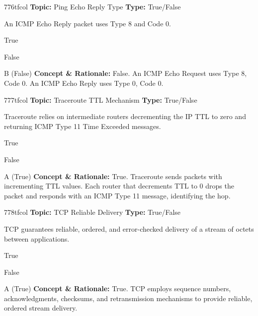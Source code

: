 \begin{qcard}{776}{tfcol}
\textcolor{darkslate!75}{\small\textbf{Topic:} Ping Echo Reply Type \hfill \textbf{Type:} True/False}\vspace{0.4em}\par
An ICMP Echo Reply packet uses Type 8 and Code 0.
\begin{qoptions}
\item True
\item False
\end{qoptions}
\end{qcard}
\nopagebreak
\begin{explainbox}{B (False)}
\textbf{Concept \& Rationale:} False. An ICMP Echo Request uses Type 8, Code 0. An ICMP Echo Reply uses Type 0, Code 0.
\end{explainbox}

\begin{qcard}{777}{tfcol}
\textcolor{darkslate!75}{\small\textbf{Topic:} Traceroute TTL Mechanism \hfill \textbf{Type:} True/False}\vspace{0.4em}\par
Traceroute relies on intermediate routers decrementing the IP TTL to zero and returning ICMP Type 11 Time Exceeded messages.
\begin{qoptions}
\item True
\item False
\end{qoptions}
\end{qcard}
\nopagebreak
\begin{explainbox}{A (True)}
\textbf{Concept \& Rationale:} True. Traceroute sends packets with incrementing TTL values. Each router that decrements TTL to 0 drops the packet and responds with an ICMP Type 11 message, identifying the hop.
\end{explainbox}

\begin{qcard}{778}{tfcol}
\textcolor{darkslate!75}{\small\textbf{Topic:} TCP Reliable Delivery \hfill \textbf{Type:} True/False}\vspace{0.4em}\par
TCP guarantees reliable, ordered, and error-checked delivery of a stream of octets between applications.
\begin{qoptions}
\item True
\item False
\end{qoptions}
\end{qcard}
\nopagebreak
\begin{explainbox}{A (True)}
\textbf{Concept \& Rationale:} True. TCP employs sequence numbers, acknowledgments, checksums, and retransmission mechanisms to provide reliable, ordered stream delivery.
\end{explainbox}

